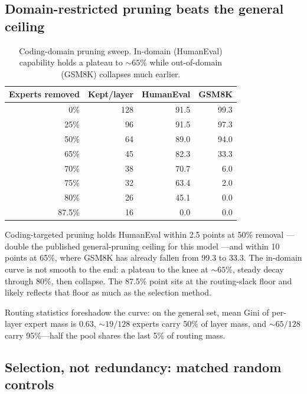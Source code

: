 \documentclass[11pt]{article}
\begin{document}
\subsection{Domain-restricted pruning beats the general ceiling}

\begin{table}[h]
\centering
\begin{tabular}{rrrr}
\toprule
Experts removed & Kept/layer & HumanEval & GSM8K \\
\midrule
0\%    & 128 & 91.5 & 99.3 \\
25\%   &  96 & 91.5 & 97.3 \\
50\%   &  64 & 89.0 & 94.0 \\
65\%   &  45 & 82.3 & 33.3 \\
70\%   &  38 & 70.7 &  6.0 \\
75\%   &  32 & 63.4 &  2.0 \\
80\%   &  26 & 45.1 &  0.0 \\
87.5\% &  16 &  0.0 &  0.0 \\
\bottomrule
\end{tabular}
\caption{Coding-domain pruning sweep. In-domain (HumanEval) capability holds a
plateau to ${\sim}65\%$ while out-of-domain (GSM8K) collapses much earlier.}
\end{table}

Coding-targeted pruning holds HumanEval within 2.5 points at 50\% removal
---double the published general-pruning ceiling for this model \cite{mone}---and
within 10 points at 65\%, where GSM8K has already fallen from 99.3 to 33.3. The
in-domain curve is not smooth to the end: a plateau to the knee at
${\sim}65\%$, steady decay through 80\%, then collapse. The 87.5\% point sits at
the routing-slack floor and likely reflects that floor as much as the selection
method.

Routing statistics foreshadow the curve: on the general set, mean Gini of
per-layer expert mass is 0.63, ${\sim}19/128$ experts carry 50\% of layer mass,
and ${\sim}65/128$ carry 95\%---half the pool shares the last 5\% of routing
mass.

\subsection{Selection, not redundancy: matched random controls}
\end{document}
